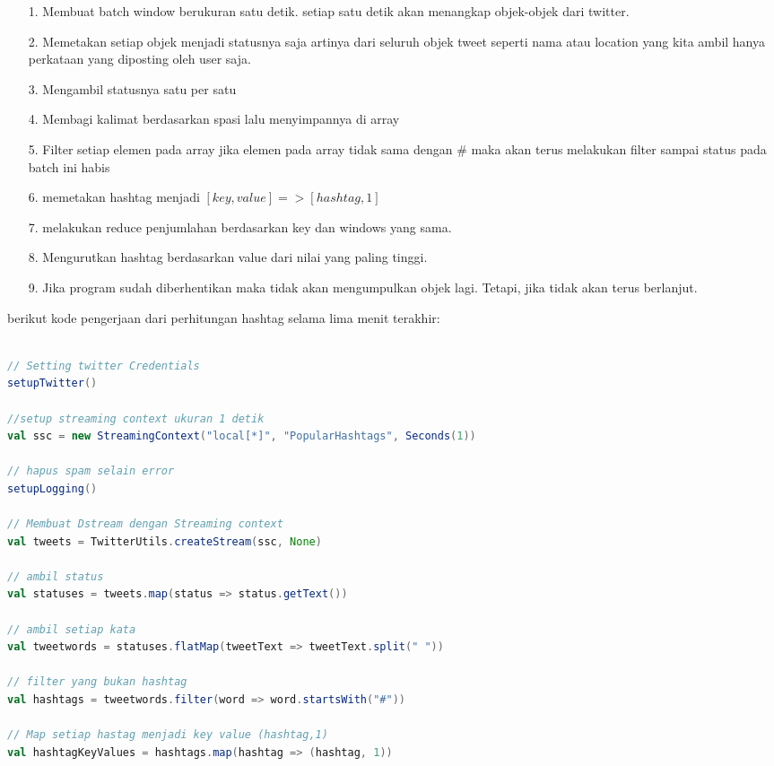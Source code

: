 \documentclass[a4paper,twoside]{article}
\begin{document}
\begin{enumerate}
\begin{enumerate}
		\item[1.]Membuat batch window berukuran satu detik. setiap satu detik akan menangkap
		objek-objek dari twitter.
		\item[2.]Memetakan setiap objek menjadi statusnya saja artinya dari seluruh objek tweet
		seperti nama atau location yang kita ambil hanya perkataan yang diposting oleh user 					saja.
		\item[3.]Mengambil statusnya satu per satu
		\item[4.]Membagi kalimat berdasarkan spasi lalu menyimpannya di array
		\item[5.]Filter setiap elemen pada array jika elemen pada array tidak sama
		dengan \# maka akan terus melakukan filter sampai status pada batch ini habis
		\item[6.]memetakan hashtag menjadi $[key,value] =>[hashtag,1]$
		\item[7.]melakukan reduce penjumlahan berdasarkan key dan windows yang sama.
		\item[8.]Mengurutkan hashtag berdasarkan value dari nilai yang paling tinggi.
		\item[9.]Jika program sudah diberhentikan maka tidak akan mengumpulkan objek lagi.
		Tetapi, jika tidak akan terus berlanjut.
\end{enumerate}
		
		berikut kode pengerjaan dari perhitungan hashtag selama lima menit terakhir:
		
\begin{lstlisting}[showstringspaces=false,language=Scala]
							
// Setting twitter Credentials
setupTwitter()
    
//setup streaming context ukuran 1 detik
val ssc = new StreamingContext("local[*]", "PopularHashtags", Seconds(1))
    
// hapus spam selain error
setupLogging()

// Membuat Dstream dengan Streaming context
val tweets = TwitterUtils.createStream(ssc, None)
    
// ambil status
val statuses = tweets.map(status => status.getText())
    
// ambil setiap kata
val tweetwords = statuses.flatMap(tweetText => tweetText.split(" "))
    
// filter yang bukan hashtag
val hashtags = tweetwords.filter(word => word.startsWith("#"))
    
// Map setiap hastag menjadi key value (hashtag,1)
val hashtagKeyValues = hashtags.map(hashtag => (hashtag, 1))
    

\end{lstlisting}
\end{enumerate}
\end{document}
